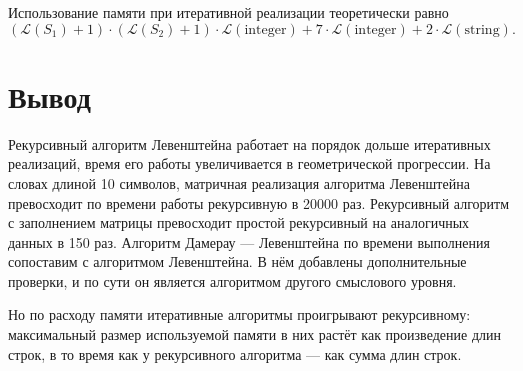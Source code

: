Использование памяти при итеративной реализации теоретически равно
\begin{equation}
(\mathcal{L}(S_1) + 1) \cdot (\mathcal{L}(S_2) + 1) \cdot \mathcal{L}\mathrm{(integer)} + 7\cdot \mathcal{L}\mathrm{(integer)} + 2 \cdot \mathcal{L}\mathrm{(string)}.
\end{equation}

\section{Вывод}

Рекурсивный алгоритм Левенштейна работает на порядок дольше итеративных реализаций, время его работы увеличивается в геометрической прогрессии. На словах длиной 10 символов, матричная реализация алгоритма Левенштейна превосходит по времени работы рекурсивную в 20000 раз. Рекурсивный алгоритм с заполнением матрицы превосходит простой рекурсивный на аналогичных данных в 150 раз. Алгоритм Дамерау — Левенштейна по времени выполнения сопоставим с алгоритмом Левенштейна. В нём добавлены дополнительные проверки, и по сути он является алгоритмом другого смыслового уровня.

Но по расходу памяти итеративные алгоритмы проигрывают рекурсивному: максимальный размер используемой памяти в них растёт как произведение длин строк, в то время как у рекурсивного алгоритма — как сумма длин строк.
